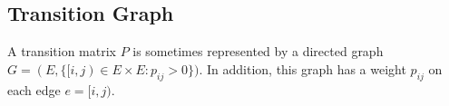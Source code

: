 \documentclass[a4paper,10pt,english]{article}
\begin{document}
\subsection{Transition Graph}
A transition matrix $P$ is sometimes represented by a directed graph $G = (E, \{[i,j) \in E \times E: p_{ij} > 0\})$. 
In addition, this graph has a weight $p_{ij}$ on each edge $e = [i,j)$. 




\end{document}
